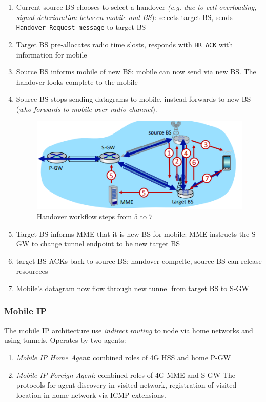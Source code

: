 \documentclass[10pt,a4paper]{report}
\theoremstyle{definition}
\begin{document}
\begin{enumerate}
	\item 
	Current source BS chooses to select a handover \textit{(e.g. due to cell overloading, signal	deterioration between mobile and BS}): selects target BS, sends \texttt{Handover Request message} to target BS
	\item 
	Target BS pre-allocates radio time slosts, responds with \texttt{HR ACK} with information for mobile
	\item 
	Source BS informs mobile of new BS: mobile can now send via new BS. The handover looks complete to the mobile
	\item 
	Source BS stops sending datagrams to mobile, instead forwards to new BS (\textit{who forwards to mobile over radio channel}).
	\begin{figure}[h]
		\centering\includegraphics[scale=0.50]{images/Pasted image 20230322121438.png}
		\caption{Handover workflow steps from $5$ to $7$}
		\label{handover-BS}
	\end{figure}
	
	\item 
	Target BS informs MME that it is new BS for mobile: MME instructs the S-GW to change tunnel endpoint to be new target BS
	\item 
	target BS ACKs back to source BS: handover compelte, source BS can release resourcees
	\item 
	Mobile's datagram now flow through new tunnel from target BS to S-GW
\end{enumerate}
\subsubsection{Mobile IP}\label{sec:mobile-ip}
The mobile IP architecture use \textit{indirect routing} to node via home networks and using tunnels. Operates by two agents:
\begin{enumerate}
	\item 
	\textit{Mobile IP Home Agent}: combined roles of 4G HSS and home P-GW
	\item 
	\textit{Mobile IP Foreign Agent}: combined roles of 4G MME and S-GW
	The protocols for agent discovery in visited network, registration of visited location in home network via ICMP extensions.
\end{enumerate}
\end{document}
